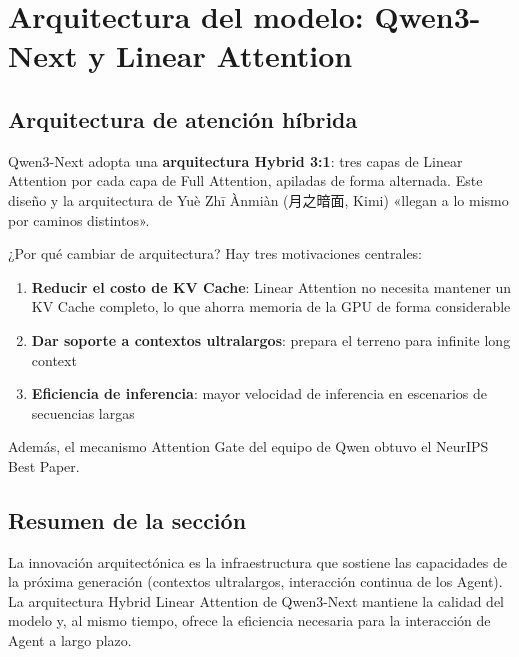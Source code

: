 \section{Arquitectura del modelo: Qwen3-Next y Linear Attention}

\subsection{Arquitectura de atención híbrida}

Qwen3-Next adopta una \textbf{arquitectura Hybrid 3:1}: tres capas de Linear Attention por cada capa de Full Attention, apiladas de forma alternada. Este diseño y la arquitectura de Yuè Zhī Ànmiàn (月之暗面, Kimi) «llegan a lo mismo por caminos distintos».

\begin{importantbox}{¿Por qué cambiar de arquitectura?}
Hay tres motivaciones centrales:
\begin{enumerate}
    \item \textbf{Reducir el costo de KV Cache}: Linear Attention no necesita mantener un KV Cache completo, lo que ahorra memoria de la GPU de forma considerable
    \item \textbf{Dar soporte a contextos ultralargos}: prepara el terreno para infinite long context
    \item \textbf{Eficiencia de inferencia}: mayor velocidad de inferencia en escenarios de secuencias largas
\end{enumerate}
Además, el mecanismo Attention Gate del equipo de Qwen obtuvo el NeurIPS Best Paper.
\end{importantbox}

\subsection{Resumen de la sección}

La innovación arquitectónica es la infraestructura que sostiene las capacidades de la próxima generación (contextos ultralargos, interacción continua de los Agent). La arquitectura Hybrid Linear Attention de Qwen3-Next mantiene la calidad del modelo y, al mismo tiempo, ofrece la eficiencia necesaria para la interacción de Agent a largo plazo.
